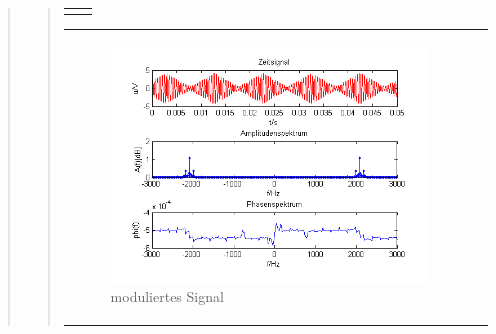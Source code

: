\begin{quote}
\begin{quote}
\begin{center}
\begin{tabular}{ll}
\begin{minipage}{0.67\textwidth}
            \end{minipage}
        
        \end{tabular}
        \end{center}
        
        \begin{center}
        \begin{tabular}{ll}
        
        \hspace{-5cm}
            \begin{minipage}{0.67\textwidth}
                
                \begin{figure}[H]
                    \label{fig:DemodreieckmT}
                    \includegraphics[scale=0.7]{Bilder/Am_Dre_2k_100Hz_mo}
                    \caption{moduliertes Signal}
                \end{figure}
        
            \end{minipage}
        

\end{tabular}
\end{center}
\end{quote}
\end{quote}
